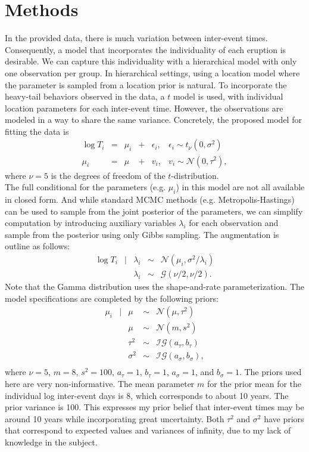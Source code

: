 \documentclass{../../tex_template/asaproc}
\newcommand{\N}{ \mathcal N }
\begin{document}
\section{Methods}
In the provided data, there is much variation between inter-event times.
Consequently, a model that incorporates the individuality of each eruption is
desirable.  We can capture this individuality with a hierarchical model with
only one observation per group. In hierarchical settings, using a location
model where the parameter is sampled from a location prior is natural. To
incorporate the heavy-tail behaviors observed in the data, a $t$ model is used,
with individual location parameters for each inter-event time. However, the
observations are modeled in a way to share the same variance. Concretely, the
proposed model for fitting the data is
$$
\begin{array}{rclclc}
  \log T_i &=& \mu_i &+&\epsilon_i, & \epsilon_i \sim t_\nu(0,\sigma^2)\\
  \mu_i &=& \mu &+& v_i, & v_i \sim \N(0,\tau^2),
\end{array}
$$
where $\nu=5$ is the degrees of freedom of the $t$-distribution.\\

The full conditional for the parameters (e.g. $\mu_i$) in this model are not all
available in closed form. And while standard MCMC methods (e.g.
Metropolis-Hastings) can be used to sample from the joint posterior of the
parameters, we can simplify computation by introducing auxiliary variables
$\lambda_i$ for each observation and sample from the posterior using only Gibbs
sampling. The augmentation is outline as follows:
$$
\begin{array}{rclcl}
  \log T_i &|& \lambda_i &\sim& \N(\mu_i,\sigma^2 / \lambda_i) \\
           & & \lambda_i &\sim& \mathcal{G}(\nu/2,\nu/2).
\end{array}
$$
Note that the Gamma distribution uses the shape-and-rate parameterization.
The model specifications are completed by the following priors:
$$
\begin{array}{rclcl}
  \mu_i &|& \mu &\sim& \N(\mu, \tau^2) \\
        & & \mu &\sim& \N(m,s^2) \\
        & & \tau^2 &\sim& \mathcal{IG}(a_\tau,b_\tau) \\
        & & \sigma^2 &\sim& \mathcal{IG}(a_\sigma,b_\sigma), \\
\end{array}
$$
where $\nu=5$, $m=8$, $s^2=100$, $a_\tau=1$, $b_\tau=1$, $a_\sigma=1$, and $b_\sigma=1$.
The priors used here are very non-informative. The mean parameter $m$ for the prior
mean for the individual log inter-event days is 8, which corresponds to about 10 years.
The prior variance is 100. This expresses my prior belief that inter-event times
may be around 10 years while incorporating great uncertainty. Both $\tau^2$ and $\sigma^2$
have priors that correspond to expected values and variances of infinity, due to my
lack of knowledge in the subject.
\end{document}
